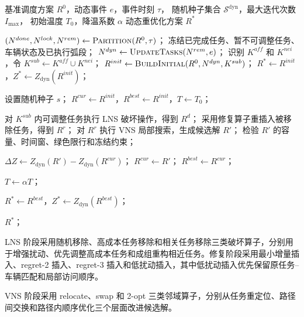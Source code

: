 \documentclass[withoutpreface,bwprint]{cumcmthesis} %
\begin{document}
\begin{algorithm}[!htbp]
\caption{事件驱动滚动时域 LNS--VNS 动态调度算法}
\label{alg:dynamic_lns_vns}
\small
\begin{algorithmic}[1]
\Require 基准调度方案 $R^0$，动态事件 $e$，事件时刻 $\tau$，
随机种子集合 $\mathcal{S}^{\mathrm{dyn}}$，最大迭代次数 $I_{\max}$，
初始温度 $T_0$，降温系数 $\alpha$
\Ensure 动态重优化方案 $R^{*}$

\State $(N^{done},N^{lock},N^{rem})\gets \textsc{Partition}(R^0,\tau)$；
\State 冻结已完成任务、暂不可调整任务、车辆状态及已执行弧段；
\State $N^{dyn}\gets \textsc{UpdateTasks}(N^{rem},e)$；
\State 识别 $K^{aff}$ 和 $K^{nei}$，令 $K^{sub}\gets K^{aff}\cup K^{nei}$；
\State $R^{init}\gets \textsc{BuildInitial}(R^0,N^{dyn},K^{sub})$；
\State $R^{*}\gets R^{init}$，$Z^{*}\gets Z_{\mathrm{dyn}}(R^{init})$；

    \State 设置随机种子 $s$；
    \State $R^{cur}\gets R^{init}$，$R^{best}\gets R^{init}$，$T\gets T_0$；

        \State 对 $K^{sub}$ 内可调整任务执行 LNS 破坏操作，得到 $R^d$；
        \State 采用修复算子重插入被移除任务，得到 $R^r$；
        \State 对 $R^r$ 执行 VNS 局部搜索，生成候选解 $R'$；
        \State 检验 $R'$ 的容量、时间窗、绿色限行和冻结约束；

            \State $\Delta Z\gets Z_{\mathrm{dyn}}(R')-Z_{\mathrm{dyn}}(R^{cur})$；
                \State $R^{cur}\gets R'$；
            \EndIf
                \State $R^{best}\gets R^{cur}$；
            \EndIf
        \EndIf

        \State $T\gets \alpha T$；
    \EndFor

        \State $R^{*}\gets R^{best}$，$Z^{*}\gets Z_{\mathrm{dyn}}(R^{best})$；
    \EndIf
\EndFor

\State \Return $R^{*}$；
\end{algorithmic}
\end{algorithm}

LNS 阶段采用随机移除、高成本任务移除和相关任务移除三类破坏算子，分别用于增强扰动、优先调整高成本任务和成组重构相近任务。修复阶段采用最小增量插入、regret-2 插入、regret-3 插入和低扰动插入，其中低扰动插入优先保留原任务--车辆匹配和局部访问顺序。

VNS 阶段采用 relocate、swap 和 2-opt 三类邻域算子，分别从任务重定位、路径间交换和路径内顺序优化三个层面改进候选解。
\end{document}
